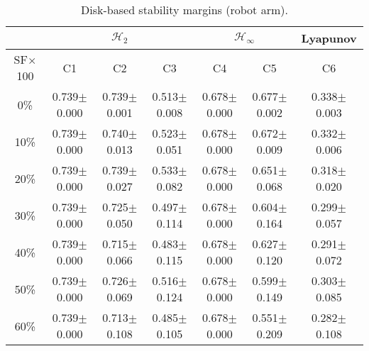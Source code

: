 \begin{table}[H]
\centering
\scriptsize
\begin{tabular}{| c || c | c | c | c | c | c |}
	\hline
	 & \multicolumn{3}{c|}{$\mathcal{H}_{2}$} & \multicolumn{2}{c|}{$\mathcal{H}_{\infty}$} & Lyapunov\\
	\hline
	SF$\times$100 & C1& C2 & C3 & C4 & C5 & C6\\
	\hline\hline
	0\% & 0.739$\pm$0.000 & 0.739$\pm$0.001 & 0.513$\pm$0.008 & 0.678$\pm$0.000 & 0.677$\pm$0.002 & 0.338$\pm$0.003\\
	\hline
	10\% & 0.739$\pm$0.000 & 0.740$\pm$0.013 & 0.523$\pm$0.051 & 0.678$\pm$0.000 & 0.672$\pm$0.009 & 0.332$\pm$0.006\\
	\hline
	20\% & 0.739$\pm$0.000 & 0.739$\pm$0.027 & 0.533$\pm$0.082 & 0.678$\pm$0.000 & 0.651$\pm$0.068 & 0.318$\pm$0.020\\
	\hline
	30\% & 0.739$\pm$0.000 & 0.725$\pm$0.050 & 0.497$\pm$0.114 & 0.678$\pm$0.000 & 0.604$\pm$0.164 & 0.299$\pm$0.057\\
	\hline
	40\% & 0.739$\pm$0.000 & 0.715$\pm$0.066 & 0.483$\pm$0.115 & 0.678$\pm$0.000 & 0.627$\pm$0.120 & 0.291$\pm$0.072\\
	\hline
	50\% & 0.739$\pm$0.000 & 0.726$\pm$0.069 & 0.516$\pm$0.124 & 0.678$\pm$0.000 & 0.599$\pm$0.149 & 0.303$\pm$0.085\\
	\hline
	60\% & 0.739$\pm$0.000 & 0.713$\pm$0.108 & 0.485$\pm$0.105 & 0.678$\pm$0.000 & 0.551$\pm$0.209 & 0.282$\pm$0.108\\
	\hline
\end{tabular}
\caption{Disk-based stability margins (robot arm).}
\label{table:disk_margins_robot_arm:unc}
\end{table}

